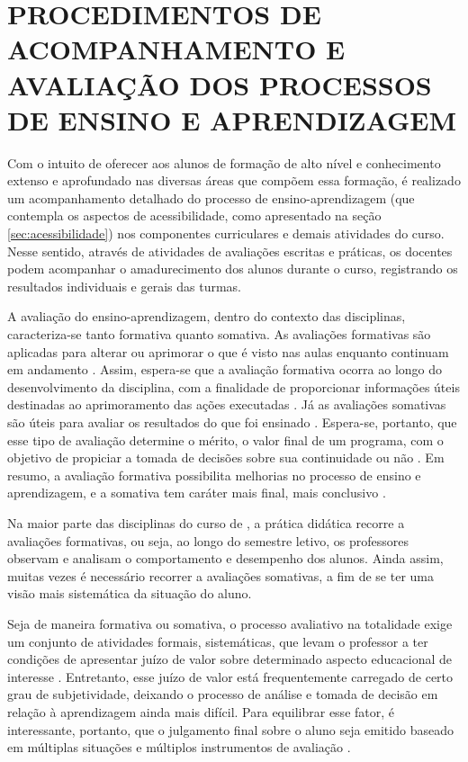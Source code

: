\chapter{PROCEDIMENTOS DE ACOMPANHAMENTO E AVALIAÇÃO DOS PROCESSOS DE ENSINO E APRENDIZAGEM}
\label{cap:procedimentos-de-acompanhamento}

Com o intuito de oferecer aos alunos de \nomedocurso formação de alto nível e conhecimento extenso e aprofundado nas diversas áreas que compõem essa formação, é realizado um acompanhamento detalhado do processo de ensino-aprendizagem (que contempla os aspectos de acessibilidade, como apresentado na seção \ref{sec:acessibilidade}) nos componentes curriculares e demais atividades do curso. Nesse sentido, através de atividades de avaliações escritas e práticas, os docentes podem acompanhar o amadurecimento dos alunos durante o curso, registrando os resultados individuais e gerais das turmas.

A avaliação do ensino-aprendizagem, dentro do contexto das disciplinas, caracteriza-se tanto formativa quanto somativa. As avaliações formativas são aplicadas para alterar ou aprimorar o que é visto nas aulas enquanto continuam em andamento \cite{russell2014avaliacao}. Assim, espera-se que a avaliação formativa ocorra ao longo do desenvolvimento da disciplina, com a finalidade de proporcionar informações úteis destinadas ao aprimoramento das ações executadas \cite{depresbiteris2017diversificar}. Já as avaliações somativas são úteis para avaliar os resultados do que foi ensinado \cite{russell2014avaliacao}. Espera-se, portanto, que esse tipo de avaliação determine o mérito, o valor final de um programa, com o objetivo de propiciar a tomada de decisões sobre sua continuidade ou não \cite{depresbiteris2017diversificar}. Em resumo, a avaliação formativa possibilita melhorias no processo de ensino e aprendizagem, e a somativa tem caráter mais final, mais conclusivo \cite{depresbiteris2017diversificar}.

Na maior parte das disciplinas do curso de \nomedocurso, a prática didática recorre a avaliações formativas, ou seja, ao longo do semestre letivo, os professores observam e analisam o comportamento e desempenho dos alunos. Ainda assim, muitas vezes é necessário recorrer a avaliações somativas, a fim de se ter uma visão mais sistemática da situação do aluno.

Seja de maneira formativa ou somativa, o processo avaliativo na totalidade exige um conjunto de atividades formais, sistemáticas, que levam o professor a ter condições de apresentar juízo de valor sobre determinado aspecto educacional de interesse \cite{depresbiteris2017diversificar}. Entretanto, esse juízo de valor está frequentemente carregado de certo grau de subjetividade, deixando o processo de análise e tomada de decisão em relação à aprendizagem ainda mais difícil. Para equilibrar esse fator, é interessante, portanto, que o julgamento final sobre o aluno seja emitido baseado em múltiplas situações e múltiplos instrumentos de avaliação \cite{depresbiteris2017diversificar}.


